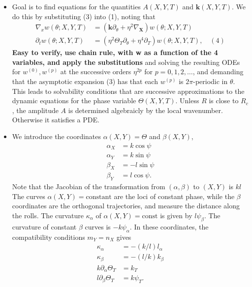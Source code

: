 \documentclass[12pt]{article}
\begin{document}
\begin{itemize}
    \item Goal is to find equations for the quantities $A(X,Y,T)$ and $\bm{k}(X,Y,T)$. We do this by substituting (3) into (1), noting that
        \begin{align*}
            \nabla_x w(\theta ; X,Y,T) &= (\bm{k}\partial_\theta + \eta^2 \nabla_{\bm{X}})w(\theta;X,Y,T)\\
            \partial_t w(\theta; X,Y,T) &= (\eta^2\Theta_T\partial_\theta +\eta^4\partial_T)w(\theta;X,Y,T), \quad (4)
        \end{align*}
        \textbf{Easy to verify, use chain rule, with w as a function of the 4 variables, and apply the substitutions}
        and solving the resulting ODEs for $w^{(0)}, w^{(p)}$ at the successive orders $\eta^{2p}$ for $p=0,1,2,\dots$, and demanding that the asymptotic expansion (3) has that each $w^{(p)}$ is $2\pi$-periodic in $\theta$. This leads to solvability conditions that are successive approximations to the dynamic equations for the phase variable $\Theta(X,Y,T)$. Unless $R$ is close to $R_c$, the amplitude $A$ is determined algebraicly by the local wavenumber. Otherwise it satisfies a PDE.
    \item We introduce the coordinates $\alpha(X,Y)=\Theta$ and $\beta(X,Y)$,
        \begin{align*}
            \alpha_X &= k\cos\psi\\
            \alpha_Y &= k\sin\psi\\
            \beta_X &= -l\sin\psi\\
            \beta_Y &= l\cos\psi.
        \end{align*}
        Note that the Jacobian of the transformation from $(\alpha,\beta)$ to $(X,Y)$ is $kl$ \newline
        The curves $\alpha(X,Y)=\text{constant}$ are the loci of constant phase, while the $\beta$ coordinates are the orthogonal trajectories, and measure the distance along the rolls. The curvature $\kappa_{\alpha}$ of $\alpha(X,Y)=\text{const}$ is given by $l\psi_{\beta}$. The curvature of constant $\beta$ curves is $-k\psi_{\alpha}$.
        In these coordinates, the compatibility conditions $m_Y=n_X$ gives
        \begin{align*}
            \kappa_{\alpha} &= -(k/l)l_{\alpha}\\
            \kappa_{\beta} &= -(l/k)k_{\beta}\\
            k\partial_{\alpha}\Theta_T &= k_T\\
            l\partial_{\beta}\Theta_T &= k\psi_T.

\end{align*}
\end{itemize}
\end{document}
